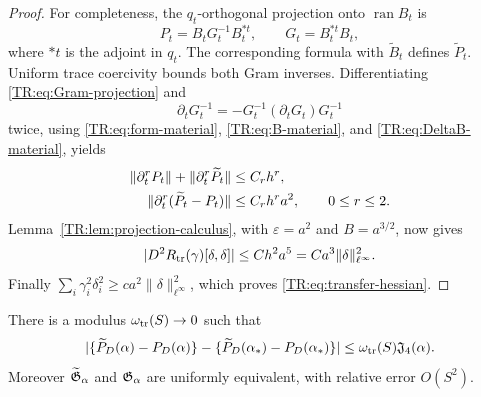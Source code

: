 \begin{proof}
For completeness, the $q_t$-orthogonal projection onto
$\operatorname {ran}B_t$ is
\begin{equation}\label{TR:eq:Gram-projection}
 P_t=B_tG_t^{-1}B_t^{*t},\qquad
 G_t=B_t^{*t}B_t,
\end{equation}
where $*t$ is the adjoint in $q_t$.  The corresponding formula with
$\widetilde B_t$ defines $\widetilde P_t$.  Uniform trace coercivity
bounds both Gram inverses.  Differentiating
\eqref{TR:eq:Gram-projection} and
\begin{equation*}
 \partial_tG_t^{-1}=-G_t^{-1}(\partial_tG_t)G_t^{-1}
\end{equation*}
twice, using \eqref{TR:eq:form-material}, \eqref{TR:eq:B-material}, and
\eqref{TR:eq:DeltaB-material}, yields
\begin{align}
 \|\partial_t^rP_t\|+\|\partial_t^r\widetilde P_t\|
 &\le C_rh^r,\notag\\
 \|\partial_t^r(\widetilde P_t-P_t)\|
 &\le C_rh^ra^2,\qquad 0\le r\le2.
 \label{TR:eq:projection-material}
\end{align}
Lemma~\ref{TR:lem:projection-calculus}, with
$\varepsilon=a^2$ and $B=a^{3/2}$, now gives
\begin{equation}\label{TR:eq:R-second-h}
 |D^2R_{\rm tr}(\gamma)[\delta,\delta]|
 \le Ch^2a^5=Ca^3\|\delta\|_{\ell^\infty}^2.
\end{equation}
Finally
$\sum_i\gamma_i^2\delta_i^2\ge ca^2
\|\delta\|_{\ell^\infty}^2$, which proves
\eqref{TR:eq:transfer-hessian}.
\end{proof}

\begin{lemma}
\label{TR:lem:physical-transfer}
There is a modulus $\omega_{\rm tr}(S)\to0$ such that
\begin{equation}\label{TR:eq:physical-transfer}
 |\{\widetilde P_D(\alpha)-P_D(\alpha)\}
  -\{\widetilde P_D(\alpha_*)-P_D(\alpha_*)\}|
 \le\omega_{\rm tr}(S)\mathfrak J_4(\alpha).
\end{equation}
Moreover $\widetilde{\mathfrak G}_\alpha$ and $\mathfrak G_\alpha$ are uniformly equivalent,
with relative error $O(S^2)$.
\end{lemma}

